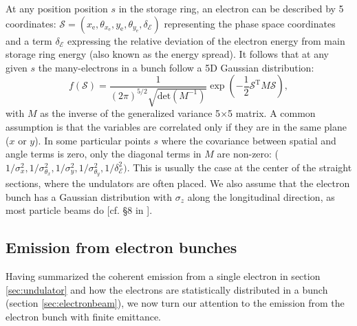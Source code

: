 \documentclass{iucr}              %
\begin{document}
At any position position $s$ in the storage ring, an electron can be described by 5 coordinates:
$\mathcal{S}= (x_\text{e},\theta_{x_\text{e}},y_\text{e},   \theta_{y_\text{e}},\delta_\mathcal{E})$ representing the phase space coordinates and a term $\delta_\mathcal{E}$ expressing the relative deviation of the electron energy from main storage ring energy (also known as the energy spread). It follows that at any given $s$ the many-electrons in a bunch follow a 5D Gaussian distribution:
\begin{equation}\label{eq:f-electrons}
f(\mathcal{S}) = \frac{1}{(2 \pi)^{5/2} \sqrt{\text{det}(M^{-1})}} \exp
        \left( -\frac{1}{2} \mathcal{S}^\text{T} M \mathcal{S} \right),
\end{equation}
with $M$ as the inverse of the generalized variance 5$\times$5 matrix. A common assumption is that the variables are correlated only if they are in the same plane ($x$ or $y$). In some particular points $s$ where the covariance between spatial and angle terms is zero, only the diagonal terms in $M$ are non-zero: ($1/\sigma_x^2,1/\sigma_{\theta_x}^2,1/\sigma_y^2,1/\sigma_{\theta_y}^2,1/\delta_\mathcal{E}^2)$. This is usually the case at the center of the straight sections, where the undulators are often placed.  We also assume that the electron bunch has a Gaussian distribution with $\sigma_z$ along the longitudinal direction, as most particle beams do [cf. \S8 in \cite{Wiedemann2015}].
 

\subsection{Emission from electron bunches}

Having summarized the coherent emission from a single electron in section \ref{sec:undulator} and how the electrons are statistically distributed in a bunch (section \ref{sec:electronbeam}), we now turn our attention to the emission from the electron bunch with finite emittance.
\end{document}
